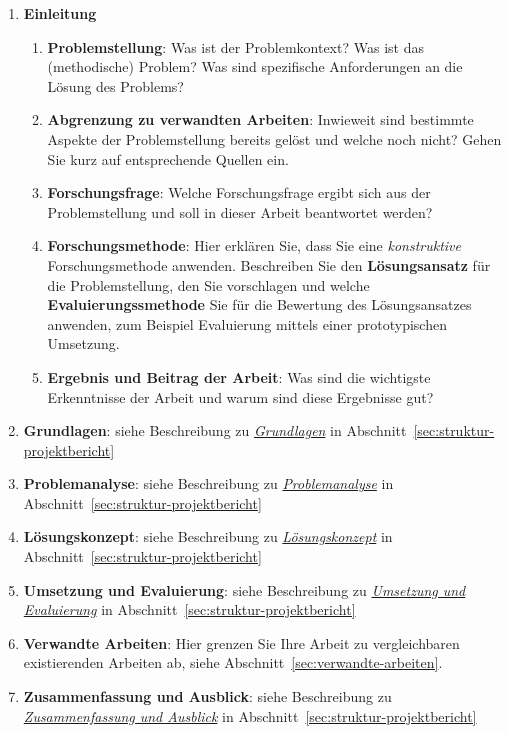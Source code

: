 \begin{enumerate}
    \item \textbf{Einleitung}
    \begin{enumerate}
        \item \textbf{Problemstellung}: Was ist der Problemkontext? Was ist das (methodische) Problem? Was sind spezifische Anforderungen an die Lösung des Problems?
        \item \textbf{Abgrenzung zu verwandten Arbeiten}: Inwieweit sind bestimmte Aspekte der Problemstellung bereits gelöst und welche noch nicht? Gehen Sie kurz auf entsprechende Quellen ein.
        \item \textbf{Forschungsfrage}: Welche Forschungsfrage ergibt sich aus der Problemstellung und soll in dieser Arbeit beantwortet werden?
        \item \textbf{Forschungsmethode}: Hier erklären Sie, dass Sie eine \textit{konstruktive} Forschungsmethode anwenden. Beschreiben Sie den \textbf{Lösungsansatz} für die Problemstellung, den Sie vorschlagen und welche \textbf{Evaluierungssmethode} Sie für die Bewertung des Lösungsansatzes anwenden, zum Beispiel Evaluierung mittels einer prototypischen Umsetzung.
        \item \textbf{Ergebnis und Beitrag der Arbeit}: Was sind die wichtigste Erkenntnisse der Arbeit und warum sind diese Ergebnisse gut?
    \end{enumerate}
    \item \textbf{Grundlagen}: siehe Beschreibung zu \hyperref[struktur:grundlagen]{\textit{Grundlagen}}  in Abschnitt~\ref{sec:struktur-projektbericht}
    \item \textbf{Problemanalyse}: siehe Beschreibung zu \hyperref[struktur:problemanalyse]{\textit{Problemanalyse}}  in Abschnitt~\ref{sec:struktur-projektbericht}
    \item \textbf{Lösungskonzept}: siehe Beschreibung zu \hyperref[struktur:loesungskonzept]{\textit{Lösungskonzept}}  in Abschnitt~\ref{sec:struktur-projektbericht}
    \item \textbf{Umsetzung und Evaluierung}: siehe Beschreibung zu \hyperref[struktur:umsetzung-und-evaluierung]{\textit{Umsetzung und Evaluierung}}  in Abschnitt~\ref{sec:struktur-projektbericht}
    \item \textbf{Verwandte Arbeiten}: Hier grenzen Sie Ihre Arbeit zu vergleichbaren existierenden Arbeiten ab, siehe Abschnitt~\ref{sec:verwandte-arbeiten}.
    \item \textbf{Zusammenfassung und Ausblick}:
    siehe Beschreibung zu \hyperref[struktur:zusammenfassung-ausblick]{\textit{Zusammenfassung und Ausblick}}  in Abschnitt~\ref{sec:struktur-projektbericht}
\end{enumerate}


